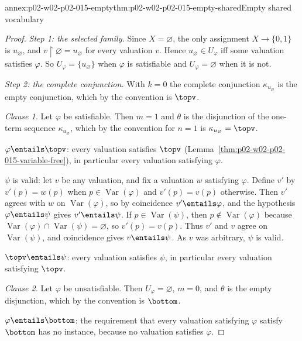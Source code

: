\begin{annexitem}{annex:p02-w02-p02-015-empty}{thm:p02-w02-p02-015-empty-shared}{Empty shared vocabulary}
\begin{proof}
\emph{Step 1: the selected family.}  Since \(X=\varnothing\), the only
assignment \(X\to\{0,1\}\) is \(u_\varnothing\), and
\(v\mathbin{\upharpoonright}\varnothing=u_\varnothing\) for every valuation
\(v\).  Hence \(u_\varnothing\in U_\varphi\) iff some valuation satisfies
\(\varphi\).  So \(U_\varphi=\{u_\varnothing\}\) when \(\varphi\) is
satisfiable and \(U_\varphi=\varnothing\) when it is not.

\emph{Step 2: the complete conjunction.}  With \(k=0\) the complete
conjunction \(\kappa_{u_\varnothing}\) is the empty conjunction, which by the
convention is \(\topv\).

\emph{Clause 1.}  Let \(\varphi\) be satisfiable.  Then \(m=1\) and \(\theta\)
is the disjunction of the one-term sequence \(\kappa_{u_\varnothing}\), which
by the convention for \(n=1\) is \(\kappa_{u_\varnothing}=\topv\).

\(\varphi\entails\topv\): every valuation satisfies \(\topv\)
(Lemma~\ref{thm:p02-w02-p02-015-variable-free}), in particular every valuation
satisfying \(\varphi\).

\(\psi\) is valid: let \(v\) be any valuation, and fix a valuation \(w\)
satisfying \(\varphi\).  Define \(v'\) by \(v'(p)=w(p)\) when
\(p\in\operatorname{Var}(\varphi)\) and \(v'(p)=v(p)\) otherwise.  Then \(v'\)
agrees with \(w\) on \(\operatorname{Var}(\varphi)\), so by coincidence
\(v'\entails\varphi\), and the hypothesis \(\varphi\entails\psi\) gives
\(v'\entails\psi\).  If \(p\in\operatorname{Var}(\psi)\), then
\(p\notin\operatorname{Var}(\varphi)\) because
\(\operatorname{Var}(\varphi)\cap\operatorname{Var}(\psi)=\varnothing\), so
\(v'(p)=v(p)\).  Thus \(v'\) and \(v\) agree on
\(\operatorname{Var}(\psi)\), and coincidence gives \(v\entails\psi\).  As
\(v\) was arbitrary, \(\psi\) is valid.

\(\topv\entails\psi\): every valuation satisfies \(\psi\), in particular every
valuation satisfying \(\topv\).

\emph{Clause 2.}  Let \(\varphi\) be unsatisfiable.  Then \(U_\varphi=
\varnothing\), \(m=0\), and \(\theta\) is the empty disjunction, which by the
convention is \(\bottom\).

\(\varphi\entails\bottom\): the requirement that every valuation satisfying
\(\varphi\) satisfy \(\bottom\) has no instance, because no valuation
satisfies \(\varphi\).


\end{proof}
\end{annexitem}
